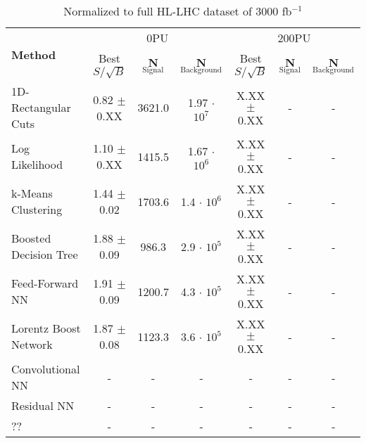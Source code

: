\documentclass{article}
\begin{document}
\begin{table}[h!]
  \hskip-4.0cm
    \begin{tabular}{|l|c|c|c|c|c|c|} %
      \hline\hline
      \multirow{2}{*}{\textbf{Method}} & \multicolumn{3}{c|}{0PU} & \multicolumn{3}{c|}{200PU}\\
      \cline{2-7}
      & Best $S/\sqrt{B}$ & \textbf{N$_{\mathrm{Signal}}$} & \textbf{N$_{\mathrm{Background}}$} & Best $S/\sqrt{B}$ & \textbf{N$_{\mathrm{Signal}}$} & \textbf{N$_{\mathrm{Background}}$}\\
      \hline
      1D-Rectangular Cuts   & 0.82 $\pm$ 0.XX & 3621.0 & 1.97 $\cdot$ $10^7$ & X.XX $\pm$ 0.XX & - & -\\
      Log Likelihood        & 1.10 $\pm$ 0.XX & 1415.5 & 1.67 $\cdot$ $10^6$ & X.XX $\pm$ 0.XX & - & - \\
      k-Means Clustering    & 1.44 $\pm$ 0.02 & 1703.6 & 1.4 $\cdot$ $10^6$ & X.XX $\pm$ 0.XX & - & - \\
      Boosted Decision Tree & 1.88 $\pm$ 0.09 & 986.3  & 2.9 $\cdot$ $10^5$ & X.XX $\pm$ 0.XX & - & - \\
      Feed-Forward NN       & 1.91 $\pm$ 0.09 & 1200.7 & 4.3 $\cdot$ $10^5$ & X.XX $\pm$ 0.XX & - & - \\
      Lorentz Boost Network & 1.87 $\pm$ 0.08 & 1123.3 & 3.6 $\cdot$ $10^5$ & X.XX $\pm$ 0.XX & - & - \\
      Convolutional NN & - & - & - & - & - & - \\                          
      Residual NN & - & - & - & - & - & - \\
      ?? & - & - & - & - & - & - \\
      \hline\hline
    \end{tabular}
    \caption{Normalized to full HL-LHC dataset of 3000 fb$^{-1}$}
\end{table}
\end{document}
